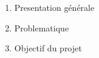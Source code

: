 \begin{enumerate}
	\item{Presentation générale}
	\item{Problematique}
	\item{Objectif du projet}

\end{enumerate}
